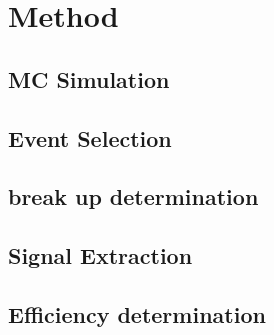 \chapter{Method}	
  \section{MC Simulation}
  \section{Event Selection}
  \section{break up determination}
  \section{Signal Extraction}
  \section{Efficiency determination}
